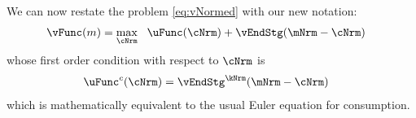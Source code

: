\documentclass[\econtexRoot/SolvingMicroDSOPs]{subfiles}
\begin{document}


We can now restate the problem \eqref{eq:vNormed} with our new notation:
\begin{equation}\begin{gathered}\begin{aligned}
      \vFunc(m) & = \max_{\cNrm} ~~ \uFunc(\cNrm)+ \vEndStg(\mNrm-\cNrm)
\end{aligned}\end{gathered}\end{equation}
whose first order condition with respect to $\cNrm$ is
\begin{equation}\begin{gathered}\begin{aligned}
  \uFunc^{c}(\cNrm) &= \vEndStg^{\kNrm}(\mNrm-\cNrm)  \label{eq:FOCnew}
\end{aligned}\end{gathered}\end{equation}
which is mathematically equivalent to the usual Euler equation for consumption.
\end{document}
